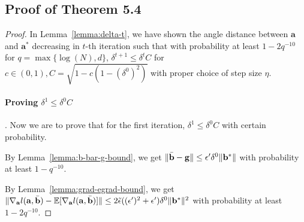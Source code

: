 \documentclass{article}
\theoremstyle{plain}
\theoremstyle{definition}
\theoremstyle{remark}
\begin{document}
\subsection{Proof of Theorem 5.4} 
\label{subsec:mainProof}
\begin{proof}
    In Lemma~\ref{lemma:delta-t}, we have shown the angle distance between $\mathbf{a}$ and $\mathbf{a}^*$ decreasing in $t$-th iteration such that with probability at least $1-2q^{-10}$ for $q=\max\{\log(N),d\}$, $\delta^{t+1} \leq \delta^{t} C $ for $c\in(0,1), C = \sqrt{1-c(1-(\delta^{0})^2)}$ with proper choice of step size $\eta$.
    \paragraph{Proving $\delta^{1}\leq \delta^{0} C $}.
    Now we are to prove that for the first iteration, $\delta^{1}\leq \delta^{0} C $ with certain probability. 

    By Lemma~\ref{lemma:b-bar-g-bound}, we get $\|\Bar{\mathbf{b}}-\mathbf{g}\| \leq \epsilon' \delta^0 \|\mathbf{b}^* \|$ with probability at least $1-q^{-10}$. 

    By Lemma~\ref{lemma:grad-egrad-bound}, we get $\lVert  \nabla_{\mathbf{a}}l(\mathbf{a},\Bar{\mathbf{b}})-\mathbb{E}[\nabla_{\mathbf{a}}l(\mathbf{a},\Bar{\mathbf{b}})]\rVert \leq 2\Tilde{\epsilon} ((\epsilon')^2+\epsilon')\delta^{0}\lVert \mathbf{b}^*\rVert^2$ with probability at least $1-2q^{-10}$.


\end{proof}
\end{document}

